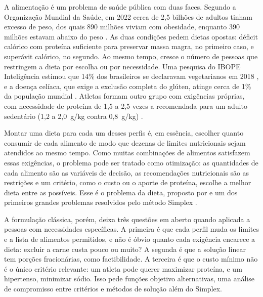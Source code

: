 \documentclass[12pt]{article}
\begin{document}
A alimentação é um problema de saúde pública com duas faces. Segundo a Organização
Mundial da Saúde, em 2022 cerca de 2,5 bilhões de adultos tinham excesso de peso, dos
quais 890 milhões viviam com obesidade, enquanto 390 milhões estavam abaixo do peso
\cite{who2024}. As duas condições pedem dietas opostas: déficit calórico com proteína
suficiente para preservar massa magra, no primeiro caso, e superávit calórico, no
segundo. Ao mesmo tempo, cresce o número de pessoas que restringem a dieta por escolha
ou por necessidade. Uma pesquisa do IBOPE Inteligência estimou que 14\% dos brasileiros
se declaravam vegetarianos em 2018 \cite{ibope2018}, e a doença celíaca, que exige a
exclusão completa do glúten, atinge cerca de 1\% da população mundial
\cite{singh2018}. Atletas formam outro grupo com exigências próprias, com necessidade
de proteína de 1,5 a 2,5 vezes a recomendada para um adulto sedentário (1,2 a 2,0~g/kg
contra 0,8~g/kg) \cite{thomas2016,iom2006}.

Montar uma dieta para cada um desses perfis é, em essência, escolher quanto consumir de
cada alimento de modo que dezenas de limites nutricionais sejam atendidos ao mesmo
tempo. Como muitas combinações de alimentos satisfazem essas exigências, o problema
pode ser tratado como otimização: as quantidades de cada alimento são as variáveis de
decisão, as recomendações nutricionais são as restrições e um critério, como o custo
ou o aporte de proteína, escolhe a melhor dieta entre as possíveis. Esse é o problema
da dieta, proposto por \cite{stigler1945} e um dos primeiros grandes problemas
resolvidos pelo método Simplex \cite{dantzig1963,dantzig1990}.

A formulação clássica, porém, deixa três questões em aberto quando aplicada a pessoas
com necessidades específicas. A primeira é que cada perfil muda os limites e a lista de
alimentos permitidos, e não é óbvio quanto cada exigência encarece a dieta: excluir a
carne custa pouco ou muito? A segunda é que a solução linear tem porções fracionárias,
como %
factibilidade. A terceira é que o custo mínimo não é o único critério relevante: um
atleta pode querer maximizar proteína, e um hipertenso, minimizar sódio. Isso pede
funções objetivo alternativas, uma análise de compromisso entre critérios e métodos de
solução além do Simplex.
\end{document}
